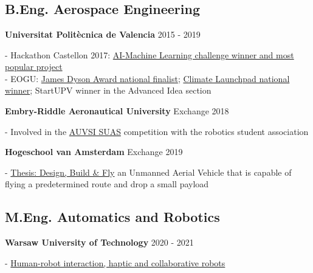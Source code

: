 \section*{\faInstitution} \label{sec:education}
 {}

\subsection{B.Eng. Aerospace Engineering}

\textbf{Universitat Politècnica de Valencia} \hfill 
{\footnotesize 2015 - 2019} \\
{
\raggedright
- Hackathon Castellon 2017:
\href{https://www.upv.es/rtv/tv/actualidad-en-la-upv/59131}{AI-Machine
    Learning challenge winner and most popular project} \\
- EOGU: \href{https://www.jamesdysonaward.org/2018/project/eogu/}{James
    Dyson Award national finalist};
\href{http://www.upv.es/noticias-upv/noticia-10449-climatelaunchp-es.html}{Climate
    Launchpad national winner}; StartUPV winner in the Advanced Idea section
\\
}

\textbf{Embry-Riddle Aeronautical University} \hfill 
{\footnotesize Exchange 2018} \\
{
\raggedright
- Involved in the \href{http://www.auvsi-suas.org/}{AUVSI SUAS} competition
with the robotics student association \\
}


\textbf{Hogeschool van Amsterdam} \hfill 
{\footnotesize Exchange 2019} \\
{
\raggedright
-
\href{https://1drv.ms/b/s!AqZvnCxLmXx9hL0wv02aRwBlym0cmA?e=0Wq9fF}{Thesis: Design,
    Build \& Fly} an Unmanned Aerial Vehicle that is capable of flying a
predetermined route and drop a small payload \\
}

\subsection{M.Eng. Automatics and Robotics}

\textbf{Warsaw University of Technology} \hfill 
{\footnotesize 2020 - 2021} \\
{
\raggedright
-
\href{https://www.linkedin.com/in/andreu-gimenez/overlay/education/674981675/multiple-media-viewer/?treasuryMediaId=1635461293122}{Human-robot
    interaction, haptic and collaborative robots} \\
}

